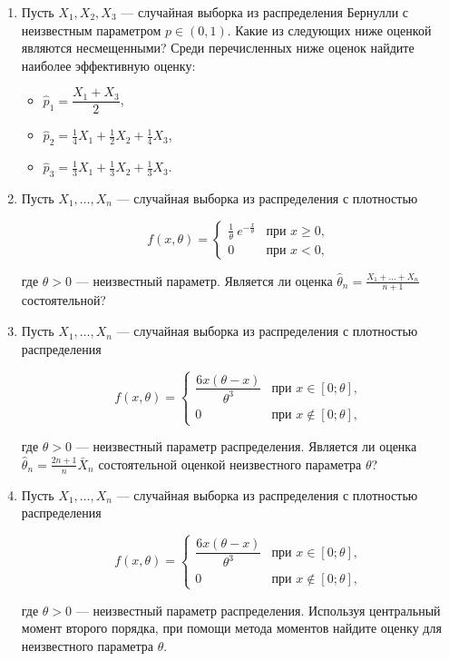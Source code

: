 \begin{enumerate}
\item Пусть $X_1, X_2, X_3$ — случайная выборка из распределения
Бернулли с неизвестным параметром $p \in (0,1)$.
Какие из следующих ниже оценкой являются несмещенными?
Среди перечисленных ниже оценок найдите наиболее эффективную оценку:

\begin{itemize}
  \item $\hat{p}_1 = \dfrac{X_1+X_3}{2}$,
  \item $\hat{p}_2 = \frac{1}{4}X_1+\frac{1}{2}X_2+\frac{1}{4}X_3$,
  \item $\hat{p}_3 = \frac{1}{3}X_1+\frac{1}{3}X_2+\frac{1}{3}X_3$.
\end{itemize}

\item Пусть $X_1, \ldots,X_n$ — случайная выборка из распределения с плотностью

\[
f(x,\theta) =
\begin{cases}
\frac{1}{\theta} \ e^{-\frac{x}{\theta}} & \text{при } x \geq 0, \\
0 & \text{при } x < 0,
\end{cases}
\]

где $\theta > 0$ — неизвестный параметр.
Является ли оценка  $\hat{\theta}_n = \frac{X_1+ \ldots + X_n}{n+1}$ состоятельной?

\item Пусть $X_1, \ldots, X_n$ — случайная выборка из распределения
с плотностью распределения

\[
f(x,\theta) = \begin{cases}
\dfrac{6x(\theta-x)}{\theta^3} & \text{при } x \in [0;\theta], \\
0 & \text{при } x \not\in [0;\theta], \end{cases}
\]

где $\theta > 0$ — неизвестный параметр распределения.
Является ли оценка $\hat{\theta}_n = \frac{2n+1}{n}\bar{X}_n$ состоятельной оценкой
неизвестного параметра $\theta$?

\item Пусть $X_1, \ldots, X_n$ — случайная выборка из распределения
с плотностью распределения

\[
f(x,\theta) =
\begin{cases}
\dfrac{6x(\theta-x)}{\theta^3} & \text{при } x \in [0;\theta], \\
0 & \text{при } x \not\in [0;\theta],
\end{cases}
\]

где $\theta > 0$ — неизвестный параметр распределения.
Используя центральный момент второго порядка, при помощи метода моментов
найдите оценку для неизвестного параметра $\theta$.


\end{enumerate}
